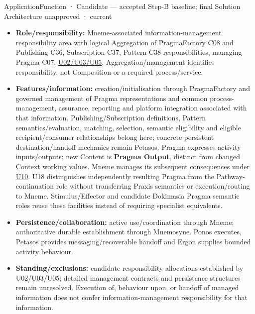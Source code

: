 \label{element:ab0cdaa7ed4149ee856216efa5a265c4}
{\small ApplicationFunction · Candidate — accepted Step-B baseline; final Solution Architecture unapproved · current}\par

\begin{itemize}


\item \textbf{Role/responsibility:} Mneme-associated information-management responsibility
  area with logical Aggregation of PragmaFactory C08 and Publishing C36,
  Subscription C37, Pattern C38 responsibilities, managing Pragma C07.
  \href{\detokenize{../../../../../docs/markdown/05-information-systems-architecture/sources.md#u05}}{U02/U03/U05}. Aggregation/management identifies responsibility,
  not Composition or a required process/service.

\item \textbf{Features/information:} creation/initialisation through PragmaFactory and
  governed management of Pragma representations and common process-management,
  assurance, reporting and platform integration associated with that information.
  Publishing/Subscription definitions, Pattern semantics/evaluation, matching,
  selection, semantic eligibility and eligible recipient/consumer relationships
  belong here; concrete persistent destination/handoff mechanics remain Petasos.
  Pragma expresses activity inputs/outputs; new Content is \textbf{Pragma Output}, distinct
  from changed Context working values. Mneme manages its subsequent consequences
  under \hyperref[element:27ad143e7c784e378556af8a57c438f7]{U10}.
  U18 distinguishes independently resulting Pragma from the Pathway-continuation
  role without transferring Praxis semantics or execution/routing to Mneme.
  Stimulus/Effector and candidate Dokimasia Pragma semantic roles
  reuse these facilities instead of requiring specialist equivalents.

\item \textbf{Persistence/collaboration:} active use/coordination through Mneme; authoritative
  durable establishment through Mnemosyne. Ponos executes, Petasos provides
  messaging/recoverable handoff and Ergon supplies bounded activity behaviour.

\item \textbf{Standing/exclusions:} candidate responsibility allocations established by
  U02/U03/U05;
  detailed management contracts and persistence structures remain unresolved.
  Execution of, behaviour upon, or handoff of managed information does not
  confer information-management responsibility for that information.

\end{itemize}

